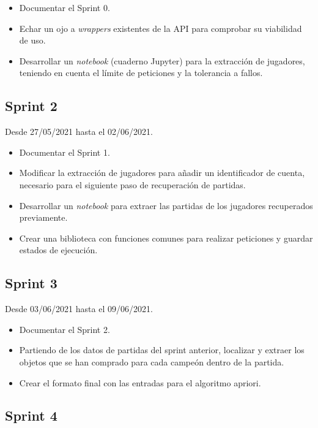 \begin{itemize}
    \item Documentar el Sprint 0.
    \item Echar un ojo a \textit{wrappers} existentes de la API para comprobar su viabilidad de uso.
    \item Desarrollar un \textit{notebook} (cuaderno Jupyter) para la extracción de jugadores, teniendo en cuenta el límite de peticiones y la tolerancia a fallos.
\end{itemize}

\subsection{Sprint 2}

Desde 27/05/2021 hasta el 02/06/2021.

\begin{itemize}
    \item Documentar el Sprint 1.
    \item Modificar la extracción de jugadores para añadir un identificador de cuenta, necesario para el siguiente paso de recuperación de partidas.
    \item Desarrollar un \textit{notebook} para extraer las partidas de los jugadores recuperados previamente.
    \item Crear una biblioteca con funciones comunes para realizar peticiones y guardar estados de ejecución.
\end{itemize}

\subsection{Sprint 3}

Desde 03/06/2021 hasta el 09/06/2021.

\begin{itemize}
    \item Documentar el Sprint 2.
    \item Partiendo de los datos de partidas del sprint anterior, localizar y extraer los objetos que se han comprado para cada campeón dentro de la partida.
    \item Crear el formato final con las entradas para el algoritmo apriori.
\end{itemize}

\subsection{Sprint 4}

